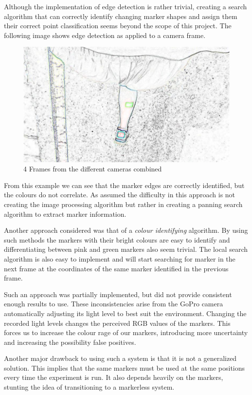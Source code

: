 Although the implementation of edge detection is rather trivial, creating a search algorithm that can correctly identify changing marker shapes and assign them their correct point classification seems beyond the scope of this project. The following image shows edge detection as applied to a camera frame.

\begin{figure}[!ht]
\captionsetup{width=0.8\linewidth, font=small} 
\includegraphics[width=0.6\linewidth]{figures/ed.jpg}
\caption{4 Frames from the different cameras combined}
\label{fig:ed}
\end{figure}

From this example we can see that the marker edges are correctly identified, but the colours do not correlate. As assumed the difficulty in this approach is not creating the image processing algorithm but rather in creating a panning search algorithm to extract marker information.

Another approach considered was that of a \textit{colour identifying} algorithm. By using such methods the markers with their bright colours are easy to identify and differentiating between pink and green markers also seem trivial. The local search algorithm is also easy to implement and will start searching for marker in the next frame at the coordinates of the same marker identified in the previous frame. 

Such an approach was partially implemented, but did not provide consistent enough results to use. These inconsistencies arise from the GoPro camera automatically adjusting its light level to best suit the environment. Changing the recorded light levels changes the perceived RGB values of the markers. This forces us to increase the colour rage of our markers, introducing more uncertainty and increasing the possibility false positives.

Another major drawback to using such a system is that it is not a generalized solution. This implies that the same markers must be used at the same positions every time the experiment is run. It also depends heavily on the markers, stunting the idea of transitioning to a markerless system.

